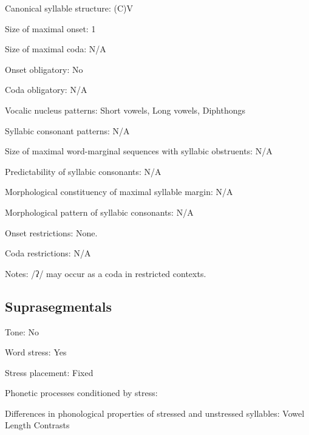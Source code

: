 {\begin{appendixdesc}
\item[Canonical syllable structure:] (C)V \citep[93--95]{Wojtylak2017}

\item[Size of maximal onset:] 1

\item[Size of maximal coda:] N/A

\item[Onset obligatory:] No

\item[Coda obligatory:] N/A

\item[Vocalic nucleus patterns:] Short vowels, Long vowels, Diphthongs

\item[Syllabic consonant patterns:] N/A

\item[Size of maximal word-marginal sequences with syllabic obstruents:] N/A

\item[Predictability of syllabic consonants:] N/A

\item[Morphological constituency of maximal syllable margin:] N/A

\item[Morphological pattern of syllabic consonants:] N/A

\item[Onset restrictions:] None.

\item[Coda restrictions:] N/A

\item[Notes:] /ʔ/ may occur as a coda in restricted contexts.
\end{appendixdesc}
\subsection*{Suprasegmentals}
\begin{appendixdesc}
\item[Tone:] No

\item[Word stress:] Yes

\item[Stress placement:] Fixed

\item[Phonetic processes conditioned by stress:]

\item[Differences in phonological properties of stressed and unstressed syllables:] Vowel Length Contrasts


\end{appendixdesc}}
